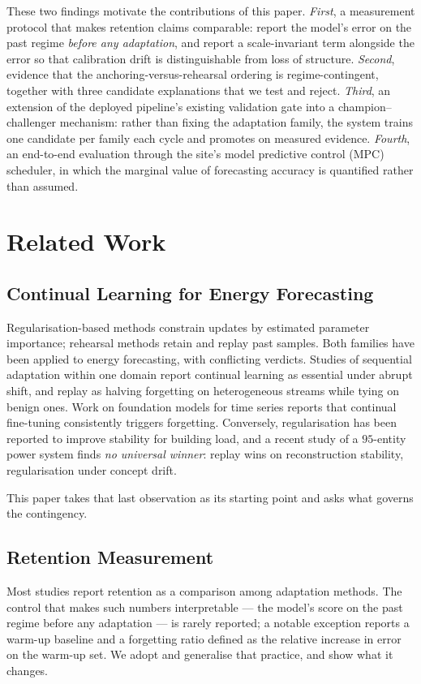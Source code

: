 \documentclass[journal]{IEEEtran}
\begin{document}
These two findings motivate the contributions of this paper.
\emph{First}, a measurement protocol that makes retention claims comparable:
report the model's error on the past regime \emph{before any adaptation}, and
report a scale-invariant term alongside the error so that calibration drift is
distinguishable from loss of structure.
\emph{Second}, evidence that the anchoring-versus-rehearsal ordering is
regime-contingent, together with three candidate explanations that we test and
reject.
\emph{Third}, an extension of the deployed pipeline's existing validation gate
into a champion--challenger mechanism: rather than fixing the adaptation family,
the system trains one candidate per family each cycle and promotes on measured
evidence.
\emph{Fourth}, an end-to-end evaluation through the site's model predictive
control (MPC) scheduler, in which the marginal value of forecasting accuracy is
quantified rather than assumed.

\section{Related Work}
\label{sec:related}

\subsection{Continual Learning for Energy Forecasting}
Regularisation-based methods constrain updates by estimated parameter
importance; rehearsal methods retain and replay past samples. Both families have
been applied to energy forecasting, with conflicting verdicts. Studies of
sequential adaptation within one domain report continual learning as essential
under abrupt shift, and replay as halving forgetting on heterogeneous streams
while tying on benign ones. Work on foundation models for time series reports
that continual fine-tuning consistently triggers forgetting. Conversely,
regularisation has been reported to improve stability for building load, and a
recent study of a $95$-entity power system finds \emph{no universal winner}:
replay wins on reconstruction stability, regularisation under concept drift.

This paper takes that last observation as its starting point and asks what
governs the contingency.

\subsection{Retention Measurement}
Most studies report retention as a comparison among adaptation methods. The
control that makes such numbers interpretable --- the model's score on the past
regime before any adaptation --- is rarely reported; a notable exception reports
a warm-up baseline and a forgetting ratio defined as the relative increase in
error on the warm-up set. We adopt and generalise that practice, and show what
it changes.
\end{document}

